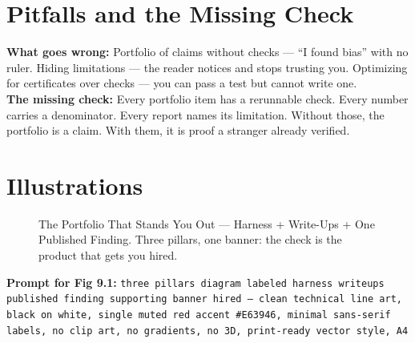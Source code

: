 \section{Pitfalls and the Missing Check}
\begin{pitfallbox}
\textbf{What goes wrong:} Portfolio of claims without checks — ``I found bias'' with no ruler. Hiding limitations — the reader notices and stops trusting you. Optimizing for certificates over checks — you can pass a test but cannot write one.\\[4pt]
\textbf{The missing check:} Every portfolio item has a rerunnable check. Every number carries a denominator. Every report names its limitation. Without those, the portfolio is a claim. With them, it is proof a stranger already verified.
\end{pitfallbox}

\section{Illustrations}
\begin{figure}[htbp]
\centering
{}
\caption{The Portfolio That Stands You Out — Harness + Write-Ups + One Published Finding. Three pillars, one banner: the check is the product that gets you hired.}
\label{fig:9-1}
\end{figure}
\textbf{Prompt for Fig 9.1:} \texttt{three pillars diagram labeled harness writeups published finding supporting banner hired — clean technical line art, black on white, single muted red accent \#E63946, minimal sans-serif labels, no clip art, no gradients, no 3D, print-ready vector style, A4}

